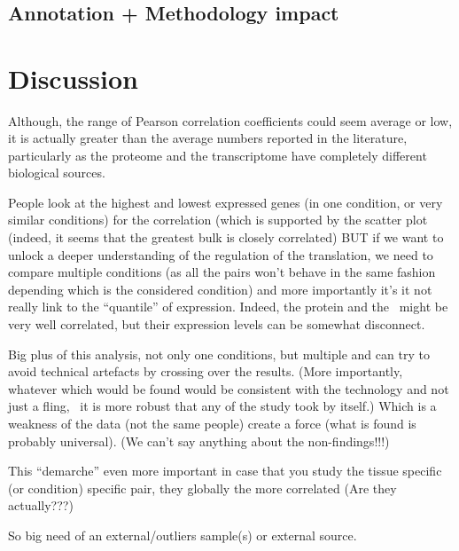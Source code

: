 \clearpage\


\subsection{Annotation + Methodology impact}


\section{Discussion}

Although, the range of Pearson correlation coefficients could seem average or
low, it is actually greater than the average numbers reported in the literature,
particularly as the proteome and the transcriptome have completely different
biological sources.



People look at the highest and lowest expressed genes (in one condition, or very
similar conditions) for the correlation (which is supported by the scatter plot
(indeed, it seems that the greatest bulk is closely correlated) {\Large BUT} if we
want to unlock a deeper understanding of the regulation of the translation, we need
to compare multiple conditions (as all the pairs won't behave in the same fashion
depending which is the considered condition) and more importantly it's it not
really link to the ``quantile'' of expression. Indeed, the protein and the \mRNA\
might be very well correlated, but their expression levels can be somewhat disconnect.

Big plus of this analysis, not only one conditions, but multiple and can try to
avoid technical artefacts by crossing over the results. (More importantly, whatever
which would be found would be consistent with the technology and not just a fling,
\ie\ it is more robust that any of the study took by itself.)
Which is a weakness of the data (not the same people) create a force (what is found
is probably universal). (We can't say anything about the non-findings!!!)

This ``demarche'' even more important in case that you study the tissue specific
(or condition) specific pair, they globally the more correlated (Are they actually???)

So big need of an external/outliers sample(s) or external source.





